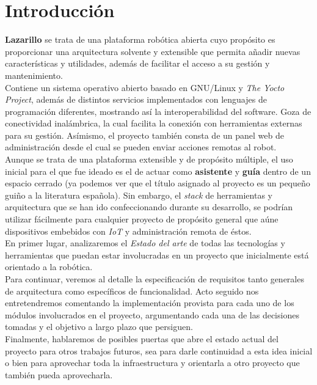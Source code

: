 \chapter{Introducción}

\textbf{Lazarillo} se trata de una plataforma robótica abierta cuyo propósito es proporcionar una arquitectura solvente y extensible que permita añadir nuevas características y utilidades, además de facilitar el acceso a su gestión y mantenimiento.\\

Contiene un sistema operativo abierto basado en GNU/Linux y \textit{The Yocto Project}, además de distintos servicios implementados con lenguajes de programación diferentes, mostrando así la interoperabilidad del software. Goza de conectividad inalámbrica, la cual facilita la conexión con herramientas externas para su gestión. Asímismo, el proyecto también consta de un panel web de administración desde el cual se pueden enviar acciones remotas al robot.\\

Aunque se trata de una plataforma extensible y de propósito múltiple, el uso inicial para el que fue ideado es el de actuar como \textbf{asistente} y \textbf{guía} dentro de un espacio cerrado (ya podemos ver que el título asignado al proyecto es un pequeño guiño a la literatura española). Sin embargo, el \textit{stack} de herramientas y arquitectura que se han ido confeccionando durante su desarrollo, se podrían utilizar fácilmente para cualquier proyecto de propósito general que aúne dispositivos embebidos con \textit{IoT} y administración remota de éstos.\\

En primer lugar, analizaremos el \textit{Estado del arte} de todas las tecnologías y herramientas que puedan estar involucradas en un proyecto que inicialmente está orientado a la robótica.\\

Para continuar, veremos al detalle la especificación de requisitos tanto generales de arquitectura como específicos de funcionalidad. Acto seguido nos entretendremos comentando la implementación provista para cada uno de los módulos involucrados en el proyecto, argumentando cada una de las decisiones tomadas y el objetivo a largo plazo que persiguen.\\

Finalmente, hablaremos de posibles puertas que abre el estado actual del proyecto para otros trabajos futuros, sea para darle continuidad a esta idea inicial o bien para aprovechar toda la infraestructura y orientarla a otro proyecto que también pueda aprovecharla.\\

